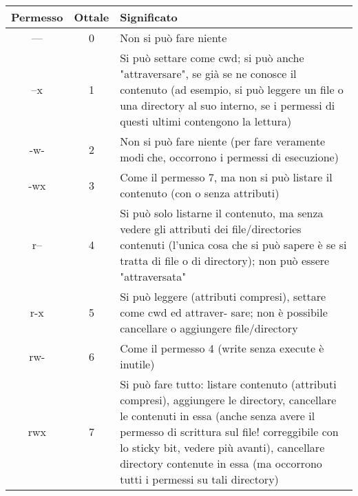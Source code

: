 \begin{center}
	\begin{tabular}{|c|c|p{10cm}|} 
		\hline
		Permesso & Ottale & Significato \\ \hline
		--- & 0 & Non si può fare niente \\ \hline
		--x & 1 & Si  può settare  come  cwd;  si  può anche  "attraversare",  se  già se
		ne conosce il contenuto (ad esempio, si può leggere un file o una
		directory al suo interno, se i permessi di questi ultimi contengono
		la lettura) \\ \hline
		-w- & 2 & Non si può fare niente (per fare veramente modiche, occorrono i
		permessi di esecuzione) \\ \hline
		-wx & 3 & Come  il  permesso  7,  ma  non  si  può listare  il  contenuto  (con  o
		senza attributi) \\ \hline
		r-- & 4 & Si  può solo  listarne  il  contenuto,  ma  senza  vedere  gli  attributi
		dei file/directories contenuti (l'unica cosa che si può sapere è se si
		tratta di file o di directory); non può essere "attraversata"\\ \hline		
		r-x & 5 & Si può leggere (attributi compresi), settare come cwd ed attraver-
		sare; non è possibile cancellare o aggiungere file/directory \\ \hline
		rw- & 6 & Come il permesso 4 (write senza execute è inutile) \\ \hline
		rwx & 7 & Si può fare tutto: listare contenuto (attributi compresi), aggiungere le directory, cancellare le contenuti in essa (anche senza avere il permesso di scrittura sul file! correggibile con lo sticky bit, vedere più avanti), cancellare directory contenute in essa (ma occorrono tutti i permessi su tali directory) \\ \hline
	\end{tabular}
\end{center}

